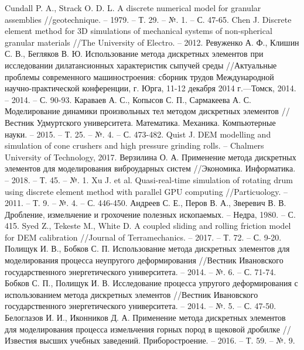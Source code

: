 \documentclass[utf8x, 14pt, oneside, a4paper]{article}
\begin{document}
		
\begin{thebibliography}{99}
 Cundall P. A., Strack O. D. L. A discrete numerical model for granular assemblies //geotechnique. – 1979. – Т. 29. – №. 1. – С. 47-65.
 Chen J. Discrete element method for 3D simulations of mechanical systems of non-spherical granular materials //The University of Electro. – 2012.
 Ревуженко А. Ф., Клишин С. В., Бегляков В. Ю. Использование метода дискретных элементов при исследовании дилатансионных характеристик сыпучей среды //Актуальные проблемы современного машиностроения: сборник трудов Международной научно-практической конференции, г. Юрга, 11-12 декабря 2014 г.—Томск, 2014. – 2014. – С. 90-93.
 Караваев А. С., Копысов С. П., Сармакеева А. С. Моделирование динамики произвольных тел методом дискретных элементов //Вестник Удмуртского университета. Математика. Механика. Компьютерные науки. – 2015. – Т. 25. – №. 4. – С. 473-482.
 Quist J. DEM modelling and simulation of cone crushers and high pressure grinding rolls. – Chalmers University of Technology, 2017.
 Верзилина О. А. Применение метода дискретных элементов для моделирования виброударных систем //Экономика. Информатика. – 2018. – Т. 45. – №. 1.
 Xu J. et al. Quasi-real-time simulation of rotating drum using discrete element method with parallel GPU computing //Particuology. – 2011. – Т. 9. – №. 4. – С. 446-450.
 Андреев С. Е., Перов В. А., Зверевич В. В. Дробление, измельчение и грохочение полезных ископаемых. – Недра, 1980. – С. 415.
 Syed Z., Tekeste M., White D. A coupled sliding and rolling friction model for DEM calibration //Journal of Terramechanics. – 2017. – Т. 72. – С. 9-20.
 Полищук И. В., Бобков С. П. Использование метода дискретных элементов для моделирования процесса неупругого деформирования //Вестник Ивановского государственного энергетического университета. – 2014. – №. 6. – С. 71-74.
 Бобков С. П., Полищук И. В. Исследование процесса упругого деформирования с использованием метода дискретных элементов //Вестник Ивановского государственного энергетического университета. – 2014. – №. 5. – С. 47-50.
 Белоглазов И. И., Иконников Д. А. Применение метода дискретных элементов для моделирования процесса измельчения горных пород в щековой дробилке //Известия высших учебных заведений. Приборостроение. – 2016. – Т. 59. – №. 9.
\end{thebibliography}
		\pagebreak
\end{document}
